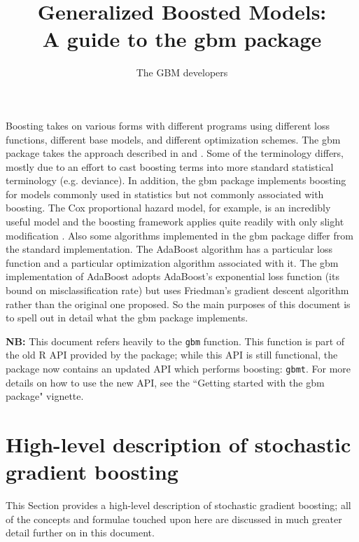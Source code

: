 \documentclass{article}
\title{Generalized Boosted Models:\\A guide to the gbm package} \author{The GBM developers}
\begin{document}


\maketitle


Boosting takes on various forms with different programs using
different loss functions, different base models, and different
optimization schemes. The gbm package takes the approach described in
\cite{Friedman:2001} and \cite{Friedman:2002}. Some of the terminology
differs, mostly due to an effort to cast boosting terms into more
standard statistical terminology (e.g. deviance). In addition, the gbm
package implements boosting for models commonly used in statistics but
not commonly associated with boosting. The Cox proportional hazard
model, for example, is an incredibly useful model and the boosting
framework applies quite readily with only slight modification
\cite{Ridgeway:1999}. Also some algorithms implemented in the gbm
package differ from the standard implementation. The AdaBoost
algorithm \cite{FreundSchapire:1997} has a particular loss function
and a particular optimization algorithm associated with it. The gbm
implementation of AdaBoost adopts AdaBoost's exponential loss function
(its bound on misclassification rate) but uses Friedman's gradient
descent algorithm rather than the original one proposed. So the main
purposes of this document is to spell out in detail what the gbm
package implements.

\textbf{NB:} This document refers heavily to the \texttt{gbm} function.  This 
function is part of the old R API provided by the package; while this API is
still functional, the package now contains an updated API which
performs boosting: \texttt{gbmt}.  For more details on how to use the new API, see
the ``Getting started with the gbm package" vignette.

\section{High-level description of stochastic gradient boosting}
This Section provides a high-level description of stochastic gradient boosting; all of the concepts and formulae touched upon here are discussed in much greater detail further on in this document. 
\end{document}
